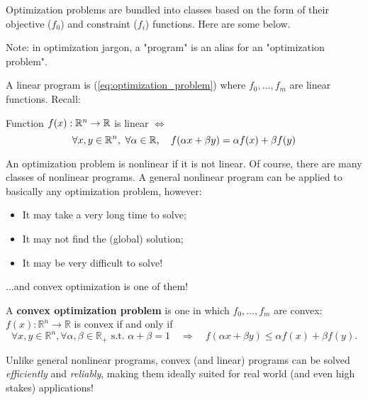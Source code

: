
Optimization problems are bundled into classes based on the form of their objective ($f_0$) and constraint ($f_i$) functions. Here are some below.

\begin{Fact}
	Note: in optimization jargon, a "program" is an alias for an "optimization problem".
\end{Fact}


A linear program is (\ref{eq:optimization_problem}) where $f_0,...,f_m$ are linear functions. Recall:

\begin{Definition}
Function $f(x):\mathbb R^n\to\mathbb R$ is linear $\Leftrightarrow$
\begin{equation*}
\forall x,y\in\mathbb R^n,\,\,\forall\alpha\in\mathbb R,\quad f(\alpha x+\beta y)=\alpha f(x)+\beta f(y)
\end{equation*}
\end{Definition}


An optimization problem is nonlinear if it is not linear. Of course, there are many classes of nonlinear programs. A general nonlinear program can be applied to basically any optimization problem, however:

\begin{itemize}
	\item It may take a very long time to solve;
	\item It may not find the (global) solution;
	\item It may be very difficult to solve!
\end{itemize}


...and convex optimization is one of them!

\begin{Definition}
	A \textbf{convex optimization problem} is one in which $f_0,\ldots,f_m$ are convex:
	$f(x):\mathbb R^n\to\mathbb R$ is convex if and only if $$
	\forall x,y\in\mathbb R^n, \forall \alpha,\beta\in\mathbb R_{+}\text{ s.t. }\alpha+\beta=1\quad\Rightarrow\quad f(\alpha x+\beta y)\le \alpha f(x)+\beta f(y).
	$$
\end{Definition}

Unlike general nonlinear programs, convex (and linear) programs can be solved \textit{efficiently} and \textit{reliably}, making them ideally suited for real world (and even high stakes) applications!

